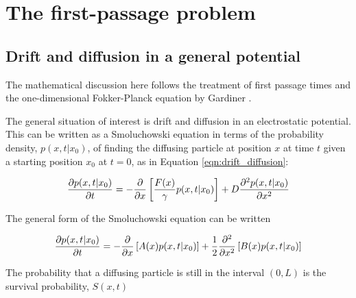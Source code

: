 \chapter{The first-passage problem}
\label{first_passage}





\section{Drift and diffusion in a general potential}

The mathematical discussion here follows the treatment of first passage times and the one-dimensional Fokker-Planck equation by Gardiner \citep{Gardiner1985}.

The general situation of interest is drift and diffusion in an electrostatic potential.  This can be written as a Smoluchowski equation in terms of the probability density, $p(x,t \lvert x_0)$, of finding the diffusing particle at position $x$ at time $t$ given a starting position $x_0$ at $t=0$, as in Equation \ref{eqn:drift_diffusion}:

\begin{equation}
\frac{\partial p(x,t|x_0)}{\partial t} = -\frac{\partial}{\partial x} \left[ \frac{F(x)}{\gamma} p(x,t|x_0) \right] + D \frac{\partial^2 p(x,t|x_0)}{\partial x^2}
\label{eqn:drift_diffusion_copy}
\end{equation}

The general form of the Smoluchowski equation can be written

\begin{equation}
\frac{\partial p(x,t|x_0)}{\partial t} = - \frac{\partial}{\partial x} \left[ A(x) p(x,t|x_0) \right] + \frac{1}{2} \frac{\partial^2 }{\partial x^2} \left[ B(x) p(x,t|x_0) \right]
\label{eqn:smoluchowski}
\end{equation}

The probability that a diffusing particle is still in the interval $(0,L)$ is the survival probability, $S(x,t)$

